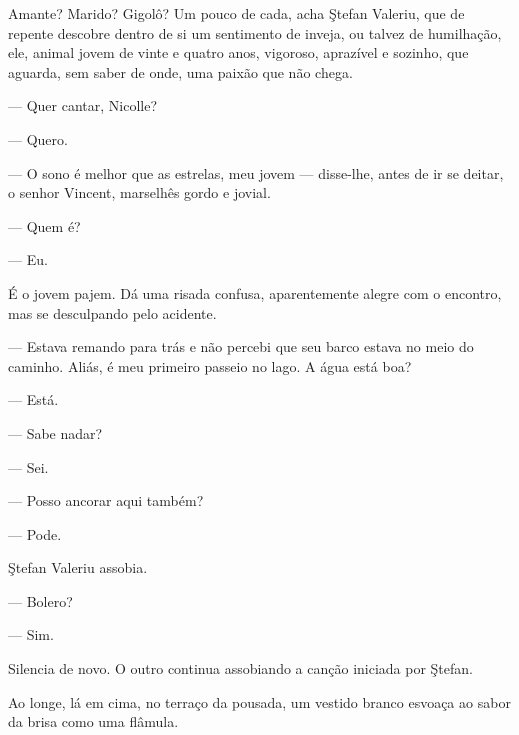 Amante? Marido? Gigolô? Um pouco de cada, acha Ştefan Valeriu, que de
repente descobre dentro de si um sentimento de inveja, ou talvez de
humilhação, ele, animal jovem de vinte e quatro anos, vigoroso,
aprazível e sozinho, que aguarda, sem saber de onde, uma paixão que não
chega.

--- Quer cantar, Nicolle?

--- Quero.

\asterisc


--- O sono é melhor que as estrelas, meu jovem --- disse-lhe, antes de
ir se deitar, o senhor Vincent, marselhês gordo e jovial.


\asterisc


--- Quem é?

--- Eu.

É o jovem pajem. Dá uma risada confusa, aparentemente alegre com o
encontro, mas se desculpando pelo acidente.

--- Estava remando para trás e não percebi que seu barco estava no meio
do caminho. Aliás, é meu primeiro passeio no lago. A água está boa?

--- Está.

--- Sabe nadar?

--- Sei.

--- Posso ancorar aqui também?

--- Pode.


Ştefan Valeriu assobia.

--- Bolero?

--- Sim.

Silencia de novo. O outro continua assobiando a canção iniciada por
Ştefan.

Ao longe, lá em cima, no terraço da pousada, um vestido branco esvoaça
ao sabor da brisa como uma flâmula.

